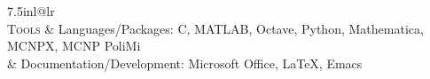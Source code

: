 \documentclass{article}
\begin{document}
\begin{tabular*}{7.5in}{l@{\extracolsep{\fill}}lr}
    \\





    \large{\textsc{Tools}}
    &
     {Languages/Packages: C, MATLAB, Octave, Python, Mathematica, MCNPX, MCNP PoliMi} \\
    &
     {Documentation/Development: Microsoft Office, \LaTeX, Emacs} \\
    \\



\end{tabular*}
\end{document}
